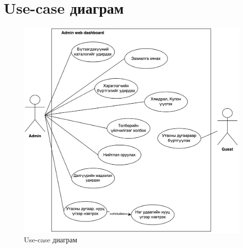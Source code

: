\section{Use-case диаграм}
\begin{figure}[h]
	\centering
	\includegraphics[scale=0.3]{src/images/usecase.png}
	\caption{Use-case диаграм}
\end{figure}
